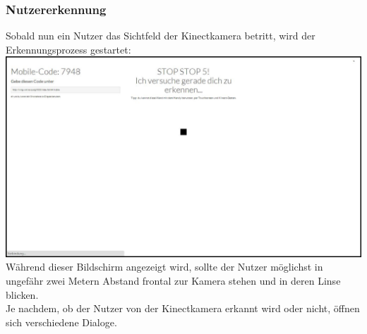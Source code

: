 \documentclass[10pt,a4paper]{report}
\begin{document}
		\subsubsection{Nutzererkennung}
		Sobald nun ein Nutzer das Sichtfeld der Kinectkamera betritt, wird der Erkennungsprozess gestartet:\\
		\includegraphics[scale=0.31]{Erkennung}\\Während dieser Bildschirm angezeigt wird, sollte der Nutzer möglichst in ungefähr zwei Metern Abstand frontal zur Kamera stehen und in deren Linse blicken.\\
Je nachdem, ob der Nutzer von der Kinectkamera erkannt wird oder nicht, öffnen sich verschiedene Dialoge.
\end{document}
